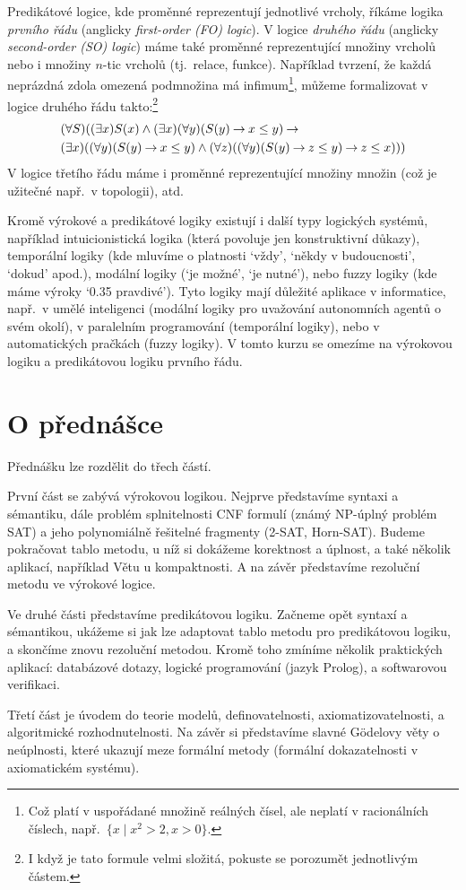 Predikátové logice, kde proměnné reprezentují jednotlivé vrcholy, říkáme logika \emph{prvního řádu} (anglicky  \emph{first-order (FO) logic}). V logice \emph{druhého řádu} (anglicky \emph{second-order (SO) logic}) máme také proměnné reprezentující množiny vrcholů nebo i množiny \(n\)-tic vrcholů (tj.\ relace, funkce). Například tvrzení, že každá neprázdná zdola omezená podmnožina má infimum\footnote{Což platí v uspořádané množině reálných čísel, ale neplatí v racionálních číslech, např.\ \( \{x \mid x^2 > 2, x > 0\} \).}, můžeme formalizovat v logice druhého řádu takto:\footnote{I když je tato formule velmi složitá, pokuste se porozumět jednotlivým částem.}
\begin{align*}
&(\forall S)((\exists x)S(x) \land (\exists x)(\forall y)(S(y) \mathbin{\rightarrow} x\leq y) \mathbin{\rightarrow}  {}\\ 
&(\exists x)((\forall y)(S(y) \mathbin{\rightarrow} x\leq y) \land (\forall z)((\forall y)(S(y) \mathbin{\rightarrow} z\leq y)\mathbin{\rightarrow} z\leq x)))
\end{align*}
V logice třetího řádu máme i proměnné reprezentující množiny množin (což je užitečné např.\ v topologii), atd.

Kromě výrokové a predikátové logiky existují i další typy logických systémů, například intuicionistická logika (která povoluje jen konstruktivní důkazy), temporální logiky (kde mluvíme o platnosti `vždy', `někdy v budoucnosti', `dokud' apod.), modální logiky (`je možné', `je nutné'), nebo fuzzy logiky (kde máme výroky `0.35 pravdivé'). Tyto logiky mají důležité aplikace v informatice, např.\ v umělé inteligenci (modální logiky pro uvažování autonomních agentů o svém okolí), v paralelním programování (temporální logiky), nebo v automatických pračkách (fuzzy logiky). %
V tomto kurzu se omezíme na výrokovou logiku a predikátovou logiku prvního řádu.


\section{O přednášce}

Přednášku lze rozdělit do třech částí. 

První část se zabývá výrokovou logikou. Nejprve představíme syntaxi a sémantiku, dále problém splnitelnosti CNF formulí (známý NP-úplný problém SAT) a jeho polynomiálně řešitelné fragmenty (2-SAT, Horn-SAT). Budeme pokračovat tablo metodu, u níž si dokážeme korektnost a úplnost, a také několik aplikací, například Větu u kompaktnosti. A na závěr představíme rezoluční metodu ve výrokové logice.

Ve druhé části představíme predikátovou logiku. Začneme opět syntaxí a sémantikou, ukážeme si jak lze adaptovat tablo metodu pro predikátovou logiku, a skončíme znovu rezoluční metodou. Kromě toho zmíníme několik praktických aplikací: databázové dotazy, logické programování (jazyk Prolog), a softwarovou verifikaci.

Třetí část je úvodem do teorie modelů, definovatelnosti, axiomatizovatelnosti, a algoritmické rozhodnutelnosti. Na závěr si představíme slavné Gödelovy věty o neúplnosti, které ukazují meze formální metody (formální dokazatelnosti v axiomatickém systému).

